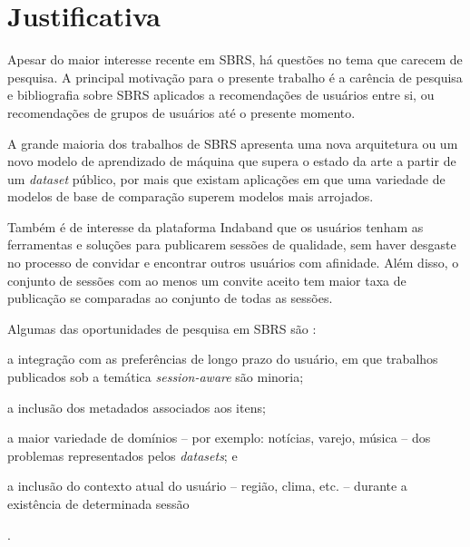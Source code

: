 \section{Justificativa}

Apesar do maior interesse recente em SBRS, há questões no tema que carecem de
 pesquisa. A principal motivação para o presente trabalho é a carência de
 pesquisa e bibliografia sobre SBRS aplicados a recomendações de usuários entre
 si, ou recomendações de grupos de usuários até o presente momento.
 
 A grande maioria dos trabalhos de SBRS apresenta uma nova arquitetura ou um
 novo modelo de aprendizado de máquina que supera o estado da arte a partir de
 um \textit{dataset} público, por mais que existam aplicações em que uma
 variedade de modelos de base de comparação superem modelos mais arrojados.
 
 Também é de interesse da plataforma Indaband que os usuários tenham as
 ferramentas e soluções para publicarem sessões de qualidade, sem haver desgaste
 no processo de convidar e encontrar outros usuários com afinidade. Além disso,
 o conjunto de sessões com ao menos um convite aceito tem maior taxa de
 publicação se comparadas ao conjunto de todas as sessões.

 Algumas das oportunidades de pesquisa em SBRS são \cite{rec_sys_handbook_2022}:
 \begin{inparaenum}[(1)]
     \item a integração com as preferências de longo prazo do usuário, em que
     trabalhos publicados sob a temática \textit{session-aware} são minoria;
     \item a inclusão dos metadados associados aos itens;
     \item a maior variedade de domínios -- por exemplo: notícias, varejo,
     música -- dos problemas representados pelos \textit{datasets}; e
     \item a inclusão do contexto atual do usuário -- região, clima, etc. --
     durante a existência de determinada sessão\end{inparaenum}.

     


